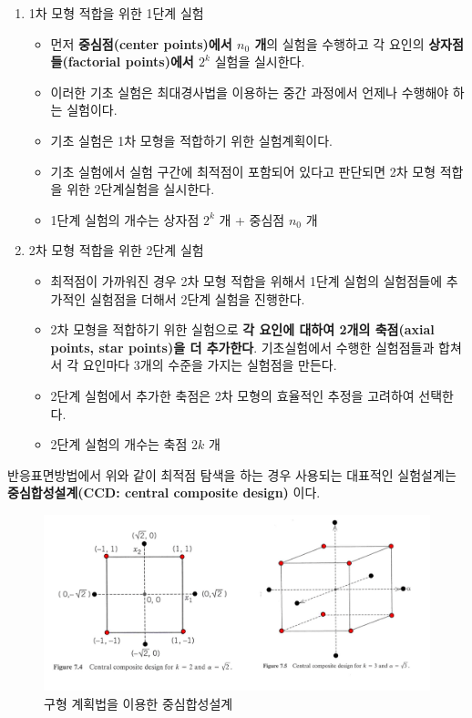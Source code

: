 \documentclass[
]{book}
\providecommand{\tightlist}{%
  \setlength{\itemsep}{0pt}\setlength{\parskip}{0pt}}
\theoremstyle{definition}
\theoremstyle{definition}
\theoremstyle{definition}
\theoremstyle{definition}
\theoremstyle{remark}
\begin{document}
\begin{enumerate}
\def\labelenumi{(\arabic{enumi})}
\tightlist
\item
  1차 모형 적합을 위한 1단계 실험

  \begin{itemize}
  \tightlist
  \item
    먼저 \textbf{중심점(center points)에서 \(n_0\) 개}의 실험을 수행하고 각 요인의 \textbf{상자점들(factorial points)에서 \(2^k\)} 실험을 실시한다.
  \item
    이러한 기초 실험은 최대경사법을 이용하는 중간 과정에서 언제나 수행해야 하는 실험이다.
  \item
    기초 실험은 1차 모형을 적합하기 위한 실험계획이다.
  \item
    기초 실험에서 실험 구간에 최적점이 포함되어 있다고 판단되면 2차 모형 적합을 위한 2단계실험을 실시한다.
  \item
    1단계 실험의 개수는 상자점 \(2^k\) 개 + 중심점 \(n_0\) 개
  \end{itemize}
\item
  2차 모형 적합을 위한 2단계 실험

  \begin{itemize}
  \tightlist
  \item
    최적점이 가까워진 경우 2차 모형 적합을 위해서 1단계 실험의 실험점들에 추가적인 실험점을 더해서 2단계 실험을 진행한다.
  \item
    2차 모형을 적합하기 위한 실험으로 \textbf{각 요인에 대하여 2개의 축점(axial points, star points)을 더 추가한다}. 기초실험에서 수행한 실험점들과 합쳐서 각 요인마다 3개의 수준을 가지는 실험점을 만든다.
  \item
    2단계 실험에서 추가한 축점은 2차 모형의 효율적인 추정을 고려하여 선택한다.
  \item
    2단계 실험의 개수는 축점 \(2k\) 개
  \end{itemize}
\end{enumerate}

반응표면방법에서 위와 같이 최적점 탐색을 하는 경우 사용되는 대표적인 실험설계는 \textbf{중심합성설계(CCD: central composite design)} 이다.

\begin{figure}

{\centering \includegraphics[width=0.8\linewidth]{myimages/ccc} 

}

\caption{구형 계획법을 이용한 중심합성설계}\label{fig:unnamed-chunk-25}
\end{figure}
\end{document}
